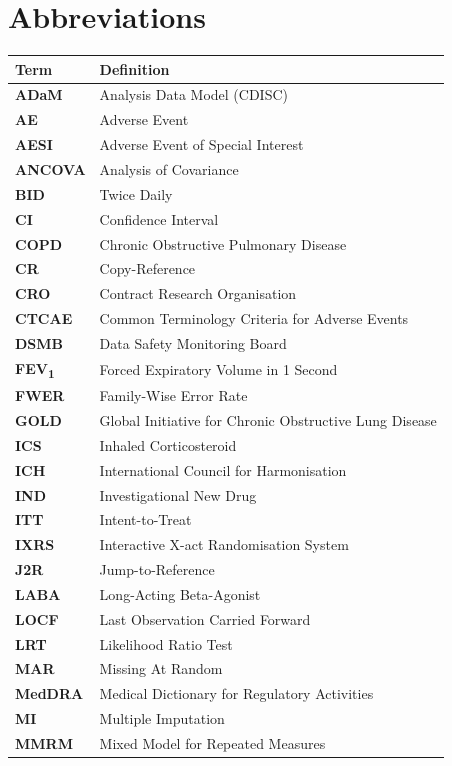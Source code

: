 \section{Abbreviations}

\begin{tabularx}{\linewidth}{@{}>{\color{sapblue}\bfseries}p{22mm}>{\raggedright\arraybackslash}X@{}}
\toprule
\textbf{Term} & \textbf{Definition} \\
\midrule
ADaM   & Analysis Data Model (CDISC) \\
AE     & Adverse Event \\
AESI   & Adverse Event of Special Interest \\
ANCOVA & Analysis of Covariance \\
BID    & Twice Daily \\
CI     & Confidence Interval \\
COPD   & Chronic Obstructive Pulmonary Disease \\
CR     & Copy-Reference \\
CRO    & Contract Research Organisation \\
CTCAE  & Common Terminology Criteria for Adverse Events \\
DSMB   & Data Safety Monitoring Board \\
FEV\textsubscript{1} & Forced Expiratory Volume in 1 Second \\
FWER   & Family-Wise Error Rate \\
GOLD   & Global Initiative for Chronic Obstructive Lung Disease \\
ICS    & Inhaled Corticosteroid \\
ICH    & International Council for Harmonisation \\
IND    & Investigational New Drug \\
ITT    & Intent-to-Treat \\
IXRS   & Interactive X-act Randomisation System \\
J2R    & Jump-to-Reference \\
LABA   & Long-Acting Beta-Agonist \\
LOCF   & Last Observation Carried Forward \\
LRT    & Likelihood Ratio Test \\
MAR    & Missing At Random \\
MedDRA & Medical Dictionary for Regulatory Activities \\
MI     & Multiple Imputation \\
MMRM   & Mixed Model for Repeated Measures \\

\end{tabularx}
